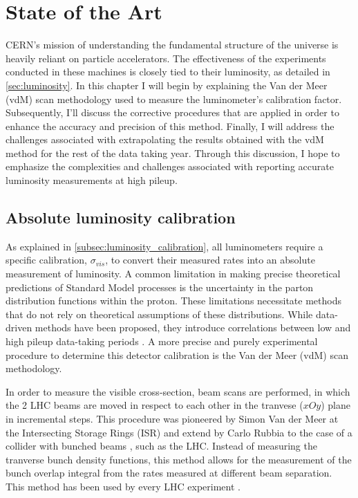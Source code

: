 \chapter{State of the Art}

CERN’s mission of understanding the fundamental structure of the universe is heavily reliant on particle accelerators. The effectiveness of the experiments conducted in these machines is closely tied to their luminosity, as detailed in \autoref{sec:luminosity}. In this chapter I will begin by explaining the Van der Meer (vdM) scan methodology used to measure the luminometer's calibration factor. Subsequently, I'll discuss the corrective procedures that are applied in order to enhance the accuracy and precision of this method. Finally, I will address the challenges associated with extrapolating the results obtained with the vdM method for the rest of the data taking year. Through this discussion, I hope to emphasize the complexities and challenges associated with reporting accurate luminosity measurements at high pileup.

\section{Absolute luminosity calibration}
\label{sec:absolute_luminosity_calibration}

As explained in \autoref{subsec:luminosity_calibration}, all luminometers require a specific calibration, $\sigma_{vis}$, to convert their measured rates into an absolute measurement of luminosity. A common limitation in making precise theoretical predictions of Standard Model processes is the uncertainty in the parton distribution functions within the proton. These limitations necessitate methods that do not rely on theoretical assumptions of these distributions. While data-driven methods have been proposed, they introduce correlations between low and high pileup data-taking periods \cite{Salfeld-Nebgen_2018}. A more precise and purely experimental procedure to determine this detector calibration is the Van der Meer (vdM) scan methodology.

In order to measure the visible cross-section, beam scans are performed, in which the 2 LHC beams are moved in respect to each other in the tranvese ($xOy$) plane in incremental steps. This procedure was pioneered by Simon Van der Meer at the Intersecting Storage Rings (ISR) \cite{vanderMeer:296752} and extend by Carlo Rubbia to the case of a collider with bunched beams \cite{Rubbia:1025746}, such as the LHC. Instead of measuring the tranverse bunch density functions, this method allows for the measurement of the bunch overlap integral from the rates measured at different beam separation. This method has been used by every LHC experiment \cite{TheLHCbcollaboration_2014, ALICE-PUBLIC-2021-001, Maettig:1513982, Sirunyan:2759951}.

